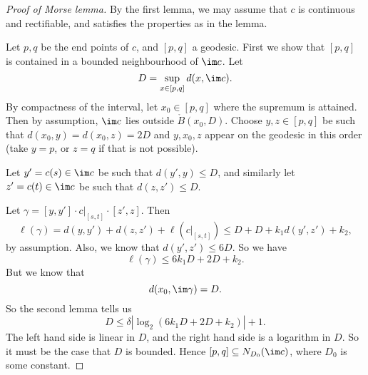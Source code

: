 \documentclass[a4paper]{article}
\begin{document}
\begin{proof}[Proof of Morse lemma]
  By the first lemma, we may assume that $c$ is continuous and rectifiable, and satisfies the properties as in the lemma.

  Let $p, q$ be the end points of $c$, and $[p, q]$ a geodesic. First we show that $[p, q]$ is contained in a bounded neighbourhood of $\im c$. Let
  \[
    D = \sup_{x \in [p, q]} d(x, \im c).
  \]
  By compactness of the interval, let $x_0 \in [p, q]$ where the supremum is attained. Then by assumption, $\im c$ lies outside $\mathring{B}(x_0, D)$. Choose $y, z \in [p, q]$ be such that $d(x_0, y) = d(x_0, z) = 2D$ and $y, x_0, z$ appear on the geodesic in this order (take $y = p$, or $z = q$ if that is not possible).

  Let $y' = c(s) \in \im c$ be such that $d(y', y) \leq D$, and similarly let $z' = c(t) \in \im c$ be such that $d(z, z') \leq D$.
  \begin{center}
  \end{center}
  Let $\gamma = [y, y'] \cdot c|_{[s, t]} \cdot [z', z]$. Then
  \[
    \ell(\gamma) = d(y, y') + d(z, z') + \ell(c|_{[s, t]}) \leq D + D + k_1 d(y', z') + k_2,
  \]
  by assumption. Also, we know that $d(y', z') \leq 6D$. So we have
  \[
    \ell(\gamma) \leq 6k_1D + 2D + k_2.
  \]
  But we know that
  \[
    d(x_0, \im \gamma) = D.
  \]
  So the second lemma tells us
  \[
    D \leq \delta |\log_2 (6 k_1 D + 2D + k_2)| + 1.
  \]
  The left hand side is linear in $D$, and the right hand side is a logarithm in $D$. So it must be the case that $D$ is bounded. Hence $[p, q] \subseteq N_{D_0}(\im c)$, where $D_0$ is some constant.


\end{proof}
\end{document}
